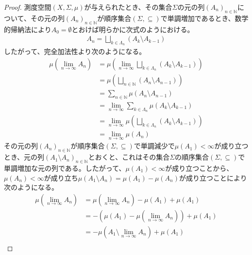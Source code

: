 \documentclass[dvipdfmx]{jsarticle}
\begin{document}
\begin{proof}
測度空間$(X,\varSigma,\mu)$が与えられたとき、その集合$\varSigma$の元の列$\left( A_{n} \right)_{n \in \mathbb{N}}$について、その元の列$\left( A_{n} \right)_{n \in \mathbb{N}}$が順序集合$(\varSigma, \subseteq )$で単調増加であるとき、数学的帰納法により$A_{0} = \emptyset$とおけば明らかに次式のようにおける。
\begin{align*}
A_{n} = \bigsqcup_{k \in \varLambda_{n}} \left( A_{k} \setminus A_{k - 1} \right)
\end{align*}
したがって、完全加法性より次のようになる。
\begin{align*}
\mu\left( \lim_{n \rightarrow \infty}A_{n} \right) &= \mu\left( \lim_{n \rightarrow \infty}{\bigsqcup_{k \in \varLambda_{n}} \left( A_{k} \setminus A_{k - 1} \right)} \right)\\
&= \mu\left( \bigsqcup_{n \in \mathbb{N}} \left( A_{n} \setminus A_{n - 1} \right) \right)\\
&= \sum_{n \in \mathbb{N}} {\mu\left( A_{n} \setminus A_{n - 1} \right)}\\
&= \lim_{n \rightarrow \infty}{\sum_{k \in \varLambda_{n}} {\mu\left( A_{k} \setminus A_{k - 1} \right)}}\\
&= \lim_{n \rightarrow \infty}{\mu\left( \bigsqcup_{k \in \varLambda_{n}} \left( A_{k} \setminus A_{k - 1} \right) \right)} \\
&= \lim_{n \rightarrow \infty}{\mu\left( A_{n} \right)}
\end{align*}
その元の列$\left( A_{n} \right)_{n \in \mathbb{N}}$が順序集合$(\varSigma, \subseteq )$で単調減少で$\mu\left( A_{1} \right) < \infty$が成り立つとき、元の列$\left( A_{1} \setminus A_{n} \right)_{n \in \mathbb{N}}$とおくと、これはその集合$\varSigma$の順序集合$(\varSigma, \subseteq )$で単調増加な元の列である。したがって、$\mu\left( A_{1} \right) < \infty$が成り立つことから、$\mu\left( A_{n} \right) < \infty$が成り立ち$\mu\left( A_{1} \setminus A_{n} \right) = \mu\left( A_{1} \right) - \mu\left( A_{n} \right)$が成り立つことにより次のようになる。
\begin{align*}
\mu\left( \lim_{n \rightarrow \infty}A_{n} \right) &= \mu\left( \lim_{n \rightarrow \infty}A_{n} \right) - \mu\left( A_{1} \right) + \mu\left( A_{1} \right)\\
&= - \left( \mu\left( A_{1} \right) - \mu\left( \lim_{n \rightarrow \infty}A_{n} \right) \right) + \mu\left( A_{1} \right)\\
&= - \mu\left( A_{1} \setminus \lim_{n \rightarrow \infty}A_{n} \right) + \mu\left( A_{1} \right)\\

\end{align*}
\end{proof}
\end{document}
